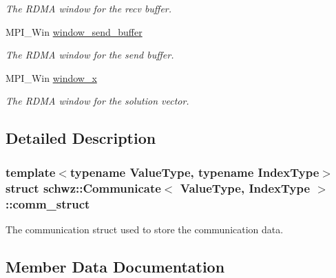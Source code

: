 \begin{DoxyCompactItemize}
\begin{DoxyCompactList}\small\item\em The R\+D\+MA window for the recv buffer. \end{DoxyCompactList}\item 
\mbox{\label{structschwz_1_1Communicate_1_1comm__struct_a7f855fe1b4cb9ceb404b7ca65636aaf3}} 
M\+P\+I\+\_\+\+Win \hyperlink{structschwz_1_1Communicate_1_1comm__struct_a7f855fe1b4cb9ceb404b7ca65636aaf3}{window\+\_\+send\+\_\+buffer}
\begin{DoxyCompactList}\small\item\em The R\+D\+MA window for the send buffer. \end{DoxyCompactList}\item 
\mbox{\label{structschwz_1_1Communicate_1_1comm__struct_ac5600fbbd9b89f3d496e35ab09f28dd0}} 
M\+P\+I\+\_\+\+Win \hyperlink{structschwz_1_1Communicate_1_1comm__struct_ac5600fbbd9b89f3d496e35ab09f28dd0}{window\+\_\+x}
\begin{DoxyCompactList}\small\item\em The R\+D\+MA window for the solution vector. \end{DoxyCompactList}\end{DoxyCompactItemize}


\subsection{Detailed Description}
\subsubsection*{template$<$typename Value\+Type, typename Index\+Type$>$\newline
struct schwz\+::\+Communicate$<$ Value\+Type, Index\+Type $>$\+::comm\+\_\+struct}

The communication struct used to store the communication data. 

\subsection{Member Data Documentation}
\mbox{\label{structschwz_1_1Communicate_1_1comm__struct_a4df6a8d7932d277cfd4d8e8ec3ab7096}} 
